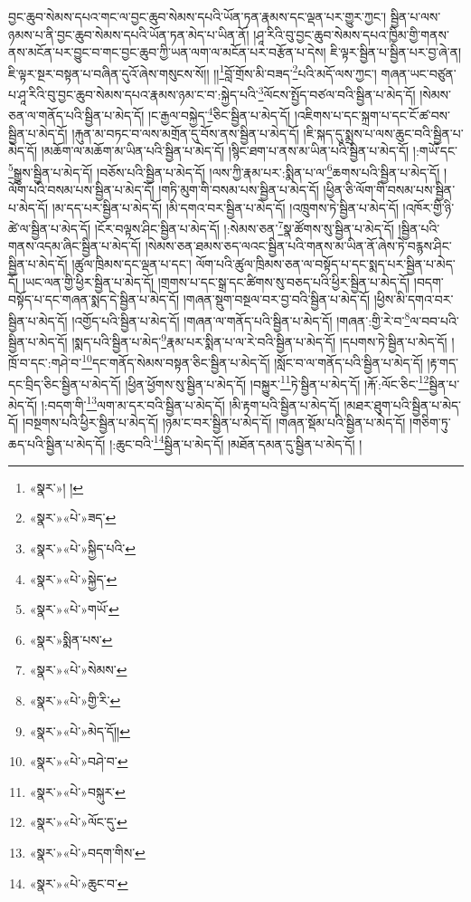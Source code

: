བྱང་ཆུབ་སེམས་དཔའ་གང་ལ་བྱང་ཆུབ་སེམས་དཔའི་ཡོན་ཏན་རྣམས་དང་ལྡན་པར་གྱུར་ཀྱང་། སྦྱིན་པ་ལས་ཉམས་པ་ནི་བྱང་ཆུབ་སེམས་དཔའི་ཡོན་ཏན་མེད་པ་ཡིན་ནོ། །ཤཱ་རིའི་བུ་བྱང་ཆུབ་སེམས་དཔའ་ཁྱིམ་གྱི་གནས་ནས་མངོན་པར་བྱུང་བ་གང་བྱང་ཆུབ་ཀྱི་ཡན་ལག་ལ་མངོན་པར་བརྩོན་པ་དེས། ཇི་ལྟར་སྦྱིན་པ་སྦྱིན་པར་བྱ་ཞེ་ན། ཇི་ལྟར་སྔར་བསྟན་པ་བཞིན་དུའོ་ཞེས་གསུངས་སོ།། །།\footnote{«སྣར་»། །}བློ་གྲོས་མི་བཟད་\footnote{«སྣར་»«པེ་»ཟད་}པའི་མདོ་ལས་ཀྱང་། གཞན་ཡང་བཙུན་པ་ཤཱ་རིའི་བུ་བྱང་ཆུབ་སེམས་དཔའ་རྣམས་ཉམ་ང་བ་:སྐྱེད་པའི་\footnote{«སྣར་»«པེ་»སྐྱིད་པའི་}ལོངས་སྤྱོད་བཙལ་བའི་སྦྱིན་པ་མེད་དོ། །སེམས་ཅན་ལ་གནོད་པའི་སྦྱིན་པ་མེད་དོ། །ང་རྒྱལ་བསྐྱེད་\footnote{«སྣར་»«པེ་»སྐྱེད་}ཅིང་སྦྱིན་པ་མེད་དོ། །འཇིགས་པ་དང་སྐྲག་པ་དང་ངོ་ཚ་བས་སྦྱིན་པ་མེད་དོ། །རྐུན་མ་བཏང་བ་ལས་མགྲོན་དུ་བོས་ནས་སྦྱིན་པ་མེད་དོ། །ཇི་སྐད་དུ་སྨྲས་པ་ལས་ཆུང་བའི་སྦྱིན་པ་མེད་དོ། །མཆོག་ལ་མཆོག་མ་ཡིན་པའི་སྦྱིན་པ་མེད་དོ། །སྙིང་ཐག་པ་ནས་མ་ཡིན་པའི་སྦྱིན་པ་མེད་དོ། །:གཡོ་དང་\footnote{«སྣར་»«པེ་»གཡོ་}སྒྱུས་སྦྱིན་པ་མེད་དོ། །བཅོས་པའི་སྦྱིན་པ་མེད་དོ། །ལས་ཀྱི་རྣམ་པར་:སྨིན་པ་ལ་\footnote{«སྣར་»སྨིན་པས་}ཆགས་པའི་སྦྱིན་པ་མེད་དོ། །ལོག་པའི་བསམ་པས་སྦྱིན་པ་མེད་དོ། །གཏི་མུག་གི་བསམ་པས་སྦྱིན་པ་མེད་དོ། །ཕྱིན་ཅི་ལོག་གི་བསམ་པས་སྦྱིན་པ་མེད་དོ། །མ་དད་པར་སྦྱིན་པ་མེད་དོ། །མི་དགའ་བར་སྦྱིན་པ་མེད་དོ། །འཁྲུགས་ཏེ་སྦྱིན་པ་མེད་དོ། །འཁོར་གྱི་ཉི་ཚེ་ལ་སྦྱིན་པ་མེད་དོ། །ངོར་བལྟས་ཤིང་སྦྱིན་པ་མེད་དོ། །:སེམས་ཅན་\footnote{«སྣར་»«པེ་»སེམས་}སྣ་ཚོགས་སུ་སྦྱིན་པ་མེད་དོ། །སྦྱིན་པའི་གནས་འདམ་ཞིང་སྦྱིན་པ་མེད་དོ། །སེམས་ཅན་ཐམས་ཅད་ལའང་སྦྱིན་པའི་གནས་མ་ཡིན་ནོ་ཞེས་ཏེ་བརྙས་ཤིང་སྦྱིན་པ་མེད་དོ། །ཚུལ་ཁྲིམས་དང་ལྡན་པ་དང་། ལོག་པའི་ཚུལ་ཁྲིམས་ཅན་ལ་བསྟོད་པ་དང་སྨད་པར་སྦྱིན་པ་མེད་དོ། །ཡང་ལན་གྱི་ཕྱིར་སྦྱིན་པ་མེད་དོ། །གྲགས་པ་དང་སྒྲ་དང་ཚིགས་སུ་བཅད་པའི་ཕྱིར་སྦྱིན་པ་མེད་དོ། །བདག་བསྟོད་པ་དང་གཞན་སྨད་དེ་སྦྱིན་པ་མེད་དོ། །གཞན་སྡུག་བསྔལ་བར་བྱ་བའི་སྦྱིན་པ་མེད་དོ། །ཕྱིས་མི་དགའ་བར་སྦྱིན་པ་མེད་དོ། །འགྱོད་པའི་སྦྱིན་པ་མེད་དོ། །གཞན་ལ་གནོད་པའི་སྦྱིན་པ་མེད་དོ། །གཞན་:གྱི་རེ་བ་\footnote{«སྣར་»«པེ་»གྱི་རི་}ལ་བབ་པའི་སྦྱིན་པ་མེད་དོ། །སྨད་པའི་སྦྱིན་པ་མེད་\footnote{«སྣར་»«པེ་»མེད་དོ།།}རྣམ་པར་སྨིན་པ་ལ་རེ་བའི་སྦྱིན་པ་མེད་དོ། །དཔགས་ཏེ་སྦྱིན་པ་མེད་དོ། །ཁྲོ་བ་དང་:གཤེ་བ་\footnote{«སྣར་»«པེ་»བཤེ་བ་}དང་གནོད་སེམས་བསྟན་ཅིང་སྦྱིན་པ་མེད་དོ། །སློང་བ་ལ་གནོད་པའི་སྦྱིན་པ་མེད་དོ། །རྟ་གད་དང་བྲིད་ཅིང་སྦྱིན་པ་མེད་དོ། །ཕྱིན་ཕྱོགས་སུ་སྦྱིན་པ་མེད་དོ། །བསྐྱུར་\footnote{«སྣར་»«པེ་»བསྐུར་}ཏེ་སྦྱིན་པ་མེད་དོ། །རྐོ་:ལོང་ཅིང་\footnote{«སྣར་»«པེ་»ལོང་དུ་}སྦྱིན་པ་མེད་དོ། །:བདག་གི་\footnote{«སྣར་»«པེ་»བདག་གིས་}ལག་མ་དར་བའི་སྦྱིན་པ་མེད་དོ། །མི་རྟག་པའི་སྦྱིན་པ་མེད་དོ། །མཐར་ཐུག་པའི་སྦྱིན་པ་མེད་དོ། །བསྔགས་པའི་ཕྱིར་སྦྱིན་པ་མེད་དོ། །ཉམ་ང་བར་སྦྱིན་པ་མེད་དོ། །གཞན་སྡོམ་པའི་སྦྱིན་པ་མེད་དོ། །གཅིག་ཏུ་ཆད་པའི་སྦྱིན་པ་མེད་དོ། །:ཆུང་བའི་\footnote{«སྣར་»«པེ་»ཆུང་བ་}སྦྱིན་པ་མེད་དོ། །མཐོན་དམན་དུ་སྦྱིན་པ་མེད་དོ། །

